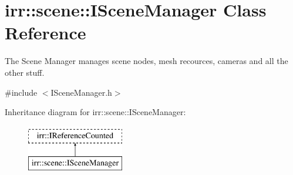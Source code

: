 \hypertarget{classirr_1_1scene_1_1ISceneManager}{}\section{irr\+:\+:scene\+:\+:I\+Scene\+Manager Class Reference}
\label{classirr_1_1scene_1_1ISceneManager}


The Scene Manager manages scene nodes, mesh recources, cameras and all the other stuff.  




{\ttfamily \#include $<$I\+Scene\+Manager.\+h$>$}

Inheritance diagram for irr\+:\+:scene\+:\+:I\+Scene\+Manager\+:\begin{figure}[H]
\begin{center}
\leavevmode
\includegraphics[height=2.000000cm]{classirr_1_1scene_1_1ISceneManager}
\end{center}
\end{figure}
